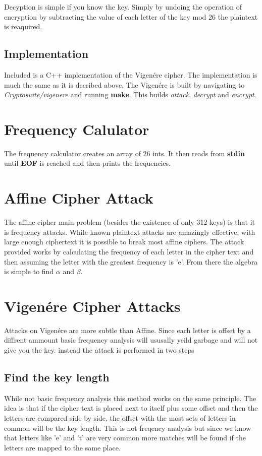 Decyption is simple if you know the key. 
Simply by undoing the operation of encryption by subtracting the value of each letter of the key mod 26 the plaintext is reaquired.

\subsection{ Implementation}

Included is a C++ implementation of the Vigen\'ere cipher.
The implementation is much the same as it is decribed above.
The Vigen\'ere is built by navigating to \textit{Cryptosuite/vigenere} and running \textbf{make}. This builds \textit{attack}, \textit{decrypt} and \textit{encrypt}.

\section{Frequency Calulator}
The frequency calculator creates an array of 26 ints. It then reads from \textbf{stdin} until \textbf{EOF} is reached and then prints the frequencies.

\section{Affine Cipher Attack}

The affine cipher main problem (besides the existence of only 312 keys) is that it is frequency attacks.
While known plaintext attacks are amazingly effective, with large enough ciphertext it is possible to break most affine ciphers.
The attack provided works by calculating the frequency of each letter in the cipher text and then assuming the letter with the greatest frequency is 'e'.
From there the algebra is simple to find $\alpha$ and $\beta$.


\section{Vigen\'ere Cipher Attacks}

Attacks on Vigen\'ere are more subtle than Affine.
Since each letter is offset by a diffrent ammount basic frequency analysis will ususally yeild garbage and will not give you the key.
instead the attack is performed in two steps

\subsection{Find the key length}
While not basic frequency analysis this method works on the same principle.
The idea is that if the cipher text is placed next to itself plus some offset and then the letters are compared side by side, 
the offset with the most sets of letters in common will be the key length.
This is not freqency analysis but since we know that letters like 'e' and 't' are very common more matches will be found if the letters are mapped to the same place.

